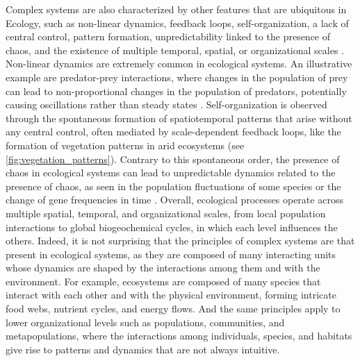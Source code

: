 Complex systems are also characterized by other features that are ubiquitous in
Ecology, such as non-linear dynamics, feedback loops, self-organization, a lack
of central control, pattern formation, unpredictability linked to the presence
of chaos, and the existence of multiple temporal, spatial, or organizational
scales \cite{Bianconi_2023}. Non-linear dynamics are extremely common in
ecological systems. An illustrative example are predator-prey interactions,
where changes in the population of prey can lead to non-proportional changes in
the population of predators, potentially causing oscillations rather than
steady states \cite{Lotka1925}. Self-organization is observed through the
spontaneous formation of spatiotemporal patterns that arise without any central
control, often mediated by scale-dependent feedback loops, like the formation
of vegetation patterns in arid ecosystems \cite{Rietkerk2008} (see
\cref{fig:vegetation_patterns}). Contrary to this spontaneous order, the
presence of chaos in ecological systems can lead to unpredictable dynamics
related to the presence of chaos, as seen in the population fluctuations of
some species or the change of gene frequencies in time \cite{May1974,May1976}.
Overall, ecological processes operate across multiple spatial, temporal, and
organizational scales, from local population interactions to global
biogeochemical cycles, in which each level influences the others. Indeed, it is
not surprising that the principles of complex systems are that present in
ecological systems, as they are composed of many interacting units whose
dynamics are shaped by the interactions among them and with the environment.
For example, ecosystems are composed of many species that interact with each
other and with the physical environment, forming intricate food webs, nutrient
cycles, and energy flows. And the same principles apply to lower organizational
levels such as populations, communities, and metapopulations, where the
interactions among individuals, species, and habitats give rise to patterns and
dynamics that are not always intuitive.

